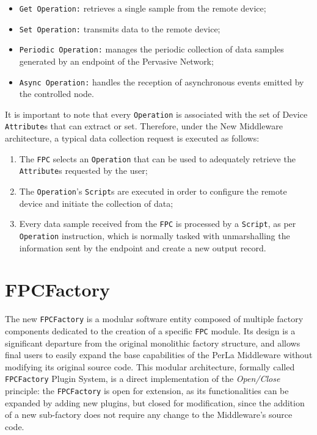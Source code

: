 \begin{itemize}

    \item \texttt{Get Operation:} retrieves a single sample from the remote
        device;

    \item \texttt{Set Operation:} transmits data to the remote device;

    \item \texttt{Periodic Operation:} manages the periodic collection of data
        samples generated by an endpoint of the Pervasive Network;

    \item \texttt{Async Operation:} handles the reception of asynchronous
        events emitted by the controlled node.

\end{itemize}

It is important to note that every \texttt{Operation} is associated with the
set of Device \texttt{Attribute}s that can extract or set. Therefore, under
the New Middleware architecture, a typical data collection request is executed
as follows:

\begin{enumerate}

    \item The \texttt{FPC} selects an \texttt{Operation} that can be used to
        adequately retrieve the \texttt{Attribute}s requested by the user;

    \item The \texttt{Operation}'s \texttt{Script}s are executed in order to
        configure the remote device and initiate the collection of data;

    \item Every data sample received from the \texttt{FPC} is processed by a
        \texttt{Script}, as per \texttt{Operation} instruction, which is
        normally tasked with unmarshalling the information sent by the endpoint
        and create a new output record.

\end{enumerate}

\section{FPCFactory}
\label{sec:newmiddleware.factory}

The new \texttt{FPCFactory} is a modular software entity composed of multiple
factory components dedicated to the creation of a specific \texttt{FPC} module.
Its design is a significant departure from the original monolithic factory
structure, and allows final users to easily expand the base capabilities of the
PerLa Middleware without modifying its original source code. This modular
architecture, formally called \texttt{FPCFactory} Plugin System, is a direct
implementation of the \textit{Open/Close} principle: the \texttt{FPCFactory}
is open for extension, as its functionalities can be expanded by adding new
plugins, but closed for modification, since the addition of a new sub-factory
does not require any change to the Middleware's source code.

